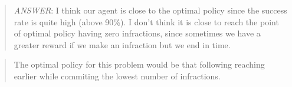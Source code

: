 \documentclass[11pt]{article}
\begin{document}
\begin{quote}
\emph{ANSWER}: I think our agent is close to the optimal policy since
the success rate is quite high (above 90\%). I don't think it is close
to reach the point of optimal policy having zero infractions, since
sometimes we have a greater reward if we make an infraction but we end
in time.
\end{quote}

\begin{quote}
The optimal policy for this problem would be that following reaching
earlier while commiting the lowest number of infractions.
\end{quote}


    
    
    
    
\end{document}
